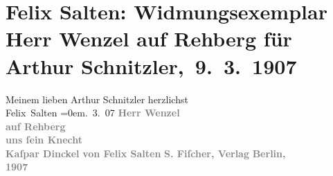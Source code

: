 

         
         \renewcommand{\erwaehntePersonen}{Personen: Felix Salten}
         \renewcommand{\erwaehnteInstitutionen}{Institutionen: S. Fischer Verlag}
         \renewcommand{\erwaehnteOrte}{Orte: Berlin, Wien}
         \renewcommand{\erwaehnteWerke}{Werke: Herr Wenzel auf Rehberg. Novelle}
               \section[ Felix Salten: Widmungsexemplar Herr Wenzel auf Rehberg für Arthur Schnitzler, 9. 3. 1907]{ Felix Salten: Widmungsexemplar Herr Wenzel auf Rehberg für Arthur
               Schnitzler, 9. 3. 1907}\nopagebreak{}\rehead{ }\begin{ledgroupsized}[t]{13cm}\normalsize\beginnumbering{} \toendnotes[C]{\smallbreak\pagebreak[2]} 
\pstart
           \noindent{}{\pb}Meinem lieben Arthur Schnitzler\pend
           \pstart
           herzlichst{\\[\baselineskip]}\spacefill\mbox{Felix Salten}\pend
           \leftskip=0em{}. 3. 07\pend
           {\bigskip}\pstart
           \noindent{}\centering{}\textcolor{gray}{\textbf{Herr Wenzel {\\}auf Rehberg {\\}uns ſein Knecht
                     {\\}Kaſpar Dinckel}}\pend
           \pstart
           \noindent{}\centering{}\textcolor{gray}{\textbf{von Felix Salten}}\pend
           {\bigskip}\pstart
           \noindent{}\centering{}\textcolor{gray}{\textbf{S. Fiſcher, Verlag}}\pend
           \pstart
           \noindent{}\centering{}\textcolor{gray}{\textbf{Berlin,}}{ }{\\}\textcolor{gray}{\textbf{1907}}\pend
           
         
         \endnumbering{}\end{ledgroupsized}  \newcommand{\dateiname}{L03046}\newcommand{\titel}{Felix Salten: Widmungsexemplar Herr Wenzel auf Rehberg für Arthur Schnitzler, 9. 3. 1907}\newcommand{\editorInnen}{Martin Anton Müller und Laura Untner}
      
